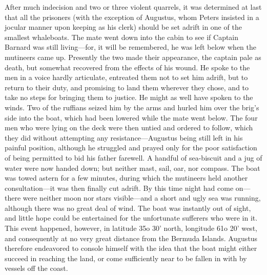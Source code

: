 After much indecision and two or three violent quarrels, it was determined at
last that all the prisoners (with the exception of Augustus, whom Peters
insisted in a jocular manner upon keeping as his clerk) should be set adrift in
one of the smallest whaleboats. The mate went down into the cabin to see if
Captain Barnard was still living---for, it will be remembered, he was left below
when the mutineers came up. Presently the two made their appearance, the captain
pale as death, but somewhat recovered from the effects of his wound. He spoke to
the men in a voice hardly articulate, entreated them not to set him adrift, but
to return to their duty, and promising to land them wherever they chose, and to
take no steps for bringing them to justice. He might as well have spoken to the
winds. Two of the ruffians seized him by the arms and hurled him over the brig's
side into the boat, which had been lowered while the mate went below. The four
men who were lying on the deck were then untied and ordered to follow, which
they did without attempting any resistance---Augustus being still left in his
painful position, although he struggled and prayed only for the poor
satisfaction of being permitted to bid his father farewell. A handful of
sea-biscuit and a jug of water were now handed down; but neither mast, sail,
oar, nor compass. The boat was towed astern for a few minutes, during which the
mutineers held another consultation---it was then finally cut adrift. By this
time night had come on---there were neither moon nor stars visible---and a short
and ugly sea was running, although there was no great deal of wind. The boat was
instantly out of sight, and little hope could be entertained for the unfortunate
sufferers who were in it. This event happened, however, in latitude 35o 30'
north, longitude 61o 20' west, and consequently at no very great distance from
the Bermuda Islands. Augustus therefore endeavored to console himself with the
idea that the boat might either succeed in reaching the land, or come
sufficiently near to be fallen in with by vessels off the coast. 

